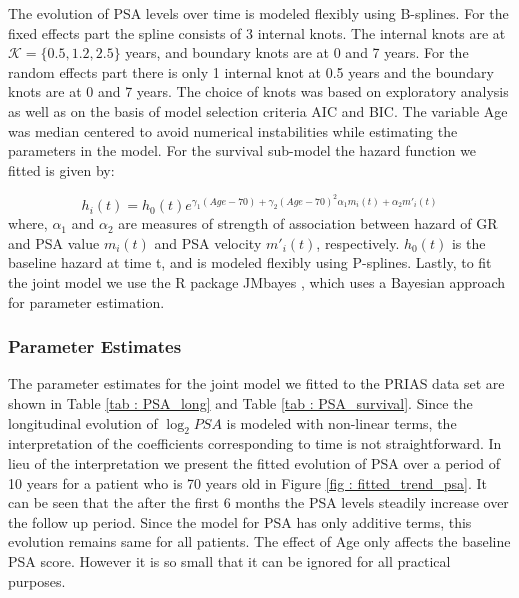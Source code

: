 The evolution of PSA levels over time is modeled flexibly using B-splines. For the fixed effects part the spline consists of 3 internal knots. The internal knots are at $\mathcal{K} =\{0.5, 1.2, 2.5\}$ years, and boundary knots are at 0 and 7 years. For the random effects part there is only 1 internal knot at 0.5 years and the boundary knots are at 0 and 7 years. The choice of knots was based on exploratory analysis as well as on the basis of model selection criteria AIC and BIC. The variable Age was median centered to avoid numerical instabilities while estimating the parameters in the model. For the survival sub-model the hazard function we fitted is given by:

\begin{equation*}
h_i(t) = h_0(t) e^{\gamma_1 (Age-70)  + \gamma_2 (Age-70)^2  \alpha_1 m_i(t) + \alpha_2 m'_i(t)}
\end{equation*}
where, $\alpha_1$ and $\alpha_2$ are measures of strength of association between hazard of GR and PSA value $m_i(t)$ and PSA velocity $m'_i(t)$, respectively. $h_0(t)$ is the baseline hazard at time t, and is modeled flexibly using P-splines\citep{eilers1996flexible}. Lastly, to fit the joint model we use the R package JMbayes \cite{rizopoulosJMbayes}, which uses a Bayesian approach for parameter estimation.

\subsubsection{Parameter Estimates}
\label{subsec : param_estimates_jm_fit_prias}
The parameter estimates for the joint model we fitted to the PRIAS data set are shown in Table \ref{tab : PSA_long} and Table \ref{tab : PSA_survival}. Since the longitudinal evolution of $\log_2 PSA$ is modeled with non-linear terms, the interpretation of the coefficients corresponding to time is not straightforward. In lieu of the interpretation we present the fitted evolution of PSA over a period of 10 years for a patient who is 70 years old in Figure \ref{fig : fitted_trend_psa}. It can be seen that the after the first 6 months the PSA levels steadily increase over the follow up period. Since the model for PSA has only additive terms, this evolution remains same for all patients. The effect of Age only affects the baseline PSA score. However it is so small that it can be ignored for all practical purposes.\\

